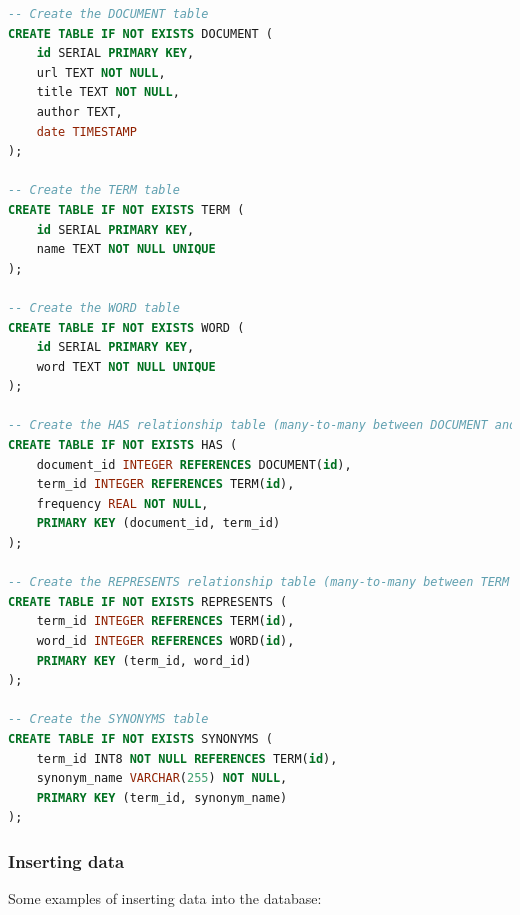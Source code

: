 \documentclass[twoside]{article}
\begin{document}
\begin{lstlisting}[language=SQL,caption={SQL Script for Creating Tables},label={lst:createtables}]
-- Create the DOCUMENT table
CREATE TABLE IF NOT EXISTS DOCUMENT (
    id SERIAL PRIMARY KEY,
    url TEXT NOT NULL,
    title TEXT NOT NULL,
    author TEXT,
    date TIMESTAMP
);

-- Create the TERM table
CREATE TABLE IF NOT EXISTS TERM (
    id SERIAL PRIMARY KEY,
    name TEXT NOT NULL UNIQUE
);

-- Create the WORD table
CREATE TABLE IF NOT EXISTS WORD (
    id SERIAL PRIMARY KEY,
    word TEXT NOT NULL UNIQUE
);

-- Create the HAS relationship table (many-to-many between DOCUMENT and TERM)
CREATE TABLE IF NOT EXISTS HAS (
    document_id INTEGER REFERENCES DOCUMENT(id),
    term_id INTEGER REFERENCES TERM(id),
    frequency REAL NOT NULL,
    PRIMARY KEY (document_id, term_id)
);

-- Create the REPRESENTS relationship table (many-to-many between TERM and WORD)
CREATE TABLE IF NOT EXISTS REPRESENTS (
    term_id INTEGER REFERENCES TERM(id),
    word_id INTEGER REFERENCES WORD(id),
    PRIMARY KEY (term_id, word_id)
);

-- Create the SYNONYMS table
CREATE TABLE IF NOT EXISTS SYNONYMS (
    term_id INT8 NOT NULL REFERENCES TERM(id),
    synonym_name VARCHAR(255) NOT NULL,
    PRIMARY KEY (term_id, synonym_name)
);
\end{lstlisting}

\subsubsection{Inserting data}

Some examples of inserting data into the database:
\end{document}
